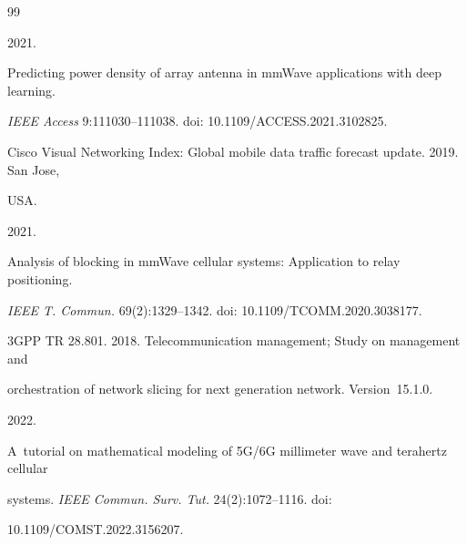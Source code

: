 {\small\frenchspacing

{ %


\begin{thebibliography}{99}


 2021. 

Predicting power density of array antenna in mmWave applications with deep learning. 

\textit{IEEE Access} 9:111030--111038. doi: 10.1109\!/\!ACCESS.2021.3102825.





Cisco Visual Networking Index: Global mobile data traffic forecast update. 2019. San Jose, 

USA.





 2021. 

Analysis of blocking in mmWave cellular systems: Application to relay positioning. 

\textit{IEEE T. Commun.} 69(2):1329--1342. doi: 10.1109\!/\!TCOMM.2020.3038177. 





3GPP TR 28.801. 2018. Telecommunication management; Study on management and 

orchestration of network slicing for next generation network.  Version~15.1.0.





 2022. 

A~tutorial on mathematical modeling of 5G/6G millimeter wave and terahertz cellular 

systems. \textit{IEEE Commun. Surv. Tut.} 24(2):1072--1116. doi: 

10.1109\!/\!COMST.2022.3156207.





\end{thebibliography}}}
